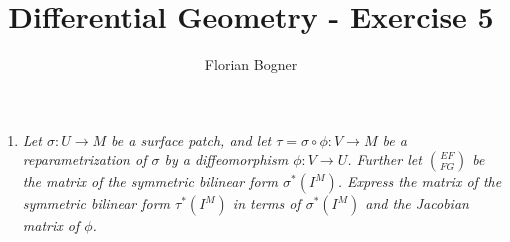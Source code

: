 \documentclass[a4paper,11pt,notitlepage,fullpage]{article}
\begin{document}
\author{Florian Bogner}
\title{Differential Geometry - Exercise 5}
\maketitle

\begin{enumerate}
\item \emph{Let $\sigma: U \to M$ be a surface patch, and let $\tau = \sigma \circ \phi: V \to M$ be a reparametrization of $\sigma$ by a diffeomorphism $\phi: V \to U$. Further let $\binom{EF}{FG}$ be the matrix of the symmetric bilinear form $\sigma^*(I^M)$. Express the matrix of the symmetric bilinear form $\tau^*(I^M)$ in terms of $\sigma^*(I^M)$ and the Jacobian matrix of $\phi$.}





\end{enumerate}
\end{document}
